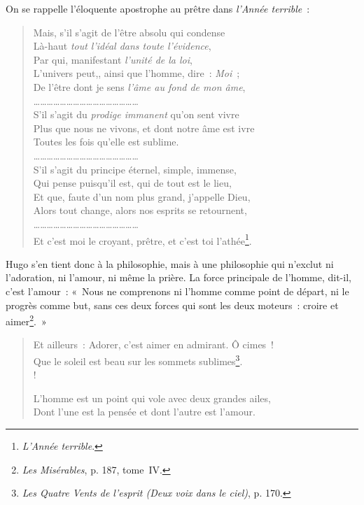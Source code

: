 \documentclass[french,twoside]{book} %
\begin{document}
\noindent On se rappelle l’éloquente apostrophe au prêtre dans \emph{l’Année terrible} :\par


\begin{verse}
Mais, s’il s’agit de l’être absolu qui condense\\
Là-haut \emph{tout l’idéal dans toute l’évidence},\\
Par qui, manifestant \emph{l’unité de la loi},\\
L’univers peut,, ainsi que l’homme, dire : \emph{Moi} ;\\
De l’être dont je sens \emph{l’âme au fond de mon âme},\\
…………………………………………\\
S’il s’agit du \emph{prodige immanent} qu’on sent vivre\\
Plus que nous ne vivons, et dont notre âme est ivre\\
Toutes les fois qu’elle est sublime.\\
…………………………………………\\
S’il s’agit du principe éternel, simple, immense,\\
Qui pense puisqu’il est, qui de tout est le lieu,\\
Et que, faute d’un nom plus grand, j’appelle Dieu,\\
Alors tout change, alors nos esprits se retournent,\\
…………………………………………\\
Et c’est moi le croyant, prêtre, et c’est toi l’athée\footnote{\emph{L’Année terrible}.}.\\
\end{verse}

\noindent Hugo s’en tient donc à la philosophie, mais à une philosophie qui n’exclut ni l’adoration, ni l’amour, ni même la prière. La force principale de l’homme, dit-il, c’est l’amour : « Nous ne comprenons ni l’homme comme point de départ, ni le progrès comme but, sans ces deux forces qui sont les deux moteurs : croire et aimer\footnote{\emph{Les Misérables}, p. 187, tome IV.}. »\par


\begin{verse}
Et ailleurs : Adorer, c’est aimer en admirant. Ô cimes !\\
Que le soleil est beau sur les sommets sublimes\footnote{\emph{Les Quatre Vents de l’esprit (Deux voix dans le ciel)}, p. 170.}.\\!

L’homme est un point qui vole avec deux grandes ailes,\\
Dont l’une est la pensée et dont l’autre est l’amour.\\
\end{verse}
\end{document}
